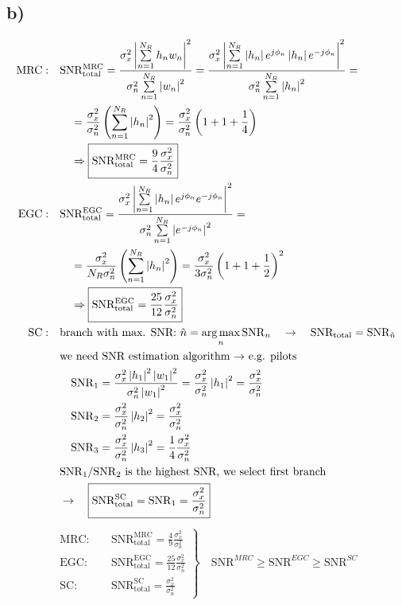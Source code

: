 \subsection*{b)}
\begin{align*}
	\mathrm{MRC:} & \quad\mathrm{SNR_{total}^{MRC}}=\frac{\sigma_x^2\left|\sum\limits_{n=1}^{N_R}h_nw_n\right|^2}{\sigma_n^2\sum\limits_{n=1}^{N_R}\left|w_n\right|^2} = \frac{\sigma_x^2\left|\sum\limits_{n=1}^{N_R}\left|h_n\right|e^{j\phi_n}\left|h_n\right|e^{-j\phi_n}\right|^2}{\sigma_n^2\sum\limits_{n=1}^{N_R}\left|h_n\right|^2}= \\
	& \qquad=\frac{\sigma_x^2}{\sigma_n^2}\left(\sum\limits_{n=1}^{N_R}\left|h_n\right|^2\right)=\frac{\sigma_x^2}{\sigma_n^2}\left(1+1+\frac{1}{4}\right) \\
	& \qquad\Rightarrow\boxed{\mathrm{SNR_{total}^{MRC}}=\frac{9}{4}\frac{\sigma_x^2}{\sigma_n^2}} \\
	\mathrm{EGC:} & \quad\mathrm{SNR_{total}^{EGC}}=\frac{\sigma_x^2\left|\sum\limits_{n=1}^{N_R}\left|h_n\right|e^{j\phi_n}e^{-j\phi_n}\right|^2}{\sigma_n^2\sum\limits_{n=1}^{N_R}\left|e^{-j\phi_n}\right|^2}= \\
	& \qquad=\frac{\sigma_x^2}{N_R\sigma_n^2}\left(\sum\limits_{n=1}^{N_R}\left|h_n\right|^2\right)=\frac{\sigma_x^2}{3\sigma_n^2}\left(1+1+\frac{1}{2}\right)^2 \\
	& \qquad\Rightarrow\boxed{\mathrm{SNR_{total}^{EGC}}=\frac{25}{12}\frac{\sigma_x^2}{\sigma_n^2}} \\
	\mathrm{SC:} & \quad\text{branch with max. SNR: } \hat{n}=\operatorname*{arg\,max}_n\mathrm{SNR}_n\quad\rightarrow\quad\mathrm{SNR_{total}}=\mathrm{SNR}_{\hat{n}} \\
	& \quad\text{we need SNR estimation algorithm $\rightarrow$ e.g. pilots} \\
	& \qquad\mathrm{SNR}_1=\frac{\sigma_x^2\left|h_1\right|^2\left|w_1\right|^2}{\sigma_n^2\left|w_1\right|^2}=\frac{\sigma_x^2}{\sigma_n^2}\left|h_1\right|^2=\frac{\sigma_x^2}{\sigma_n^2} \\
	& \qquad\mathrm{SNR}_2=\frac{\sigma_x^2}{\sigma_n^2}\left|h_2\right|^2=\frac{\sigma_x^2}{\sigma_n^2} \\
	& \qquad\mathrm{SNR}_3=\frac{\sigma_x^2}{\sigma_n^2}\left|h_3\right|^2=\frac{1}{4}\frac{\sigma_x^2}{\sigma_n^2} \\
	& \quad\text{$\mathrm{SNR}_1$/$\mathrm{SNR}_2$ is the highest SNR, we select first branch} \\
	& \quad\rightarrow\quad\boxed{\mathrm{SNR_{total}^{SC}}=\mathrm{SNR}_1=\frac{\sigma_x^2}{\sigma_n^2}}
\end{align*}
\begin{align*}
	\left.
	\begin{aligned}
		\mathrm{MRC:} & \quad\mathrm{SNR_{total}^{MRC}}=\frac{4}{9}\frac{\sigma_x^2}{\sigma_n^2} \\
    \mathrm{EGC:} & \quad\mathrm{SNR_{total}^{EGC}}=\frac{25}{12}\frac{\sigma_x^2}{\sigma_n^2} \\
		\mathrm{SC:} & \quad\mathrm{SNR_{total}^{SC}}=\frac{\sigma_x^2}{\sigma_n^2}
  \end{aligned}
	\right\}
	\quad\boxed{\mathrm{SNR}^{MRC}\ge\mathrm{SNR}^{EGC}\ge\mathrm{SNR}^{SC}}
\end{align*}

